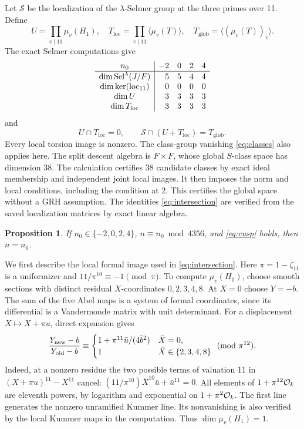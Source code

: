 \documentclass[11pt,reqno]{amsart}
\newtheorem{proposition}[theorem]{Proposition}
\theoremstyle{definition}\newtheorem{definition}[theorem]{Definition}
\theoremstyle{remark}\newtheorem{remark}[theorem]{Remark}
\numberwithin{equation}{section}
\begin{document}
Let \(\mathcal S\) be the localization of the \(\lambda\)-Selmer
group at the three primes over 11. Define
\[
 U=\prod_{v\mid11}\mu_v(H_1),\quad
 T_{\mathrm{loc}}=\prod_{v\mid11}\langle\mu_v(T)\rangle,\quad
 T_{\mathrm{glob}}=\langle(\mu_v(T))_v\rangle.
\]
The exact Selmer computations give
\[
\begin{array}{c|rrrr}
 n_0&-2&0&2&4\\\hline
 \dim\operatorname{Sel}^\lambda(J/F)&5&5&4&4\\
 \dim\ker(\mathrm{loc}_{11})&0&0&0&0\\
 \dim U&3&3&3&3\\
 \dim T_{\mathrm{loc}}&3&3&3&3
\end{array}
\]
and
\begin{equation}\label{eq:intersection}
 U\cap T_{\mathrm{loc}}=0,\qquad
 \mathcal S\cap(U+T_{\mathrm{loc}})=T_{\mathrm{glob}}.
\end{equation}
Every local torsion image is nonzero. The class-group vanishing
\eqref{eq:classes} also applies here. The split descent algebra is
\(F\times F\), whose global \(S\)-class space has dimension 38.
The calculation certifies 38 candidate classes by exact ideal
membership and independent joint local images. It then imposes the
norm and local conditions, including the condition at 2. This
certifies the global space without a GRH assumption. The identities
\eqref{eq:intersection} are verified from the saved localization
matrices by exact linear algebra.

\begin{proposition}\label{prop:even}
If \(n_0\in\{-2,0,2,4\}\), \(n\equiv n_0\bmod4356\), and
\eqref{eq:cusp} holds, then \(n=n_0\).
\end{proposition}

We first describe the local formal image used in
\eqref{eq:intersection}. Here \(\pi=1-\zeta_{11}\) is a uniformizer
and \(11/\pi^{10}\equiv-1\pmod\pi\).
To compute \(\mu_v(H_1)\), choose smooth sections with distinct
residual \(X\)-coordinates
\(0,2,3,4,8\). At \(X=0\) choose \(Y=-b\).
The sum of the five Abel maps is a system of formal coordinates, since
its differential is a Vandermonde matrix with unit determinant.
For a displacement \(X\mapsto X+\pi u\), direct expansion gives
\[
 \frac{Y_{\rm new}-b}{Y_{\rm old}-b}
 \equiv
 \begin{cases}
 1+\pi^{11}\bar u/(4\bar b^2)&\bar X=0,\\
 1&\bar X\in\{2,3,4,8\}
 \end{cases}\pmod{\pi^{12}}.
\]
Indeed, at a nonzero residue the two possible terms of valuation 11
in \((X+\pi u)^{11}-X^{11}\) cancel:
\( (11/\pi^{10})\bar X^{10}\bar u+\bar u^{11}=0\).
All elements of \(1+\pi^{12}\mathcal O_k\) are eleventh powers, by logarithm
and exponential on \(1+\pi^2\mathcal O_k\). The first line generates the
nonzero unramified Kummer line. Its nonvanishing is also verified by
the local Kummer maps in the computation. Thus \(\dim\mu_v(H_1)=1\).
\end{document}
